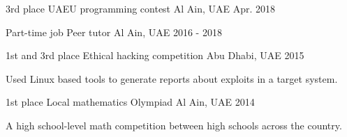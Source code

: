 


\begin{cventries}


    \cventry
    {3rd place} %
    {UAEU programming contest} %
    {Al Ain, UAE} %
    {Apr. 2018} %
    {}



    \cventry
    {Part-time job} %
    {Peer tutor} %
    {Al Ain, UAE} %
    {2016 - 2018} %
    {}



    \cventry
    {1st and 3rd place} %
    {Ethical hacking competition} %
    {Abu Dhabi, UAE} %
    {2015} %
    {
        \begin{cvitems}
            \item {Used Linux based tools to generate reports about exploits in a target system.}
        \end{cvitems}
    }



    \cventry
    {1st place} %
    {Local mathematics Olympiad} %
    {Al Ain, UAE} %
    {2014} %
    {
        \begin{cvitems}
            \item {A high school-level math competition between high schools across the country.}
        \end{cvitems}
    }



\end{cventries}

